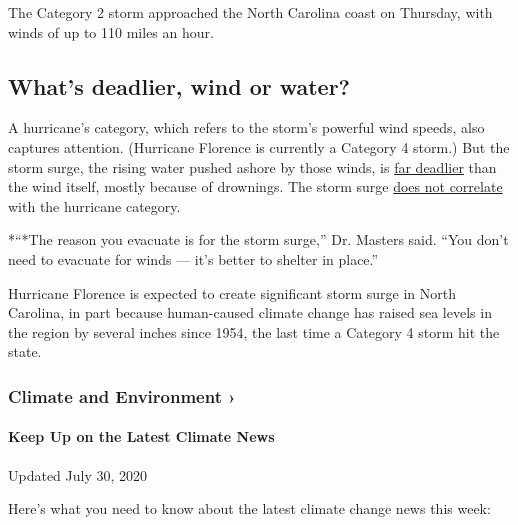 The Category 2 storm approached the North Carolina coast on Thursday,
with winds of up to 110 miles an hour.

\hypertarget{whats-deadlier-wind-or-water}{%
\subsection{What's deadlier, wind or
water?}\label{whats-deadlier-wind-or-water}}

A hurricane's category, which refers to the storm's powerful wind
speeds, also captures attention. (Hurricane Florence is currently a
Category 4 storm.) But the storm surge, the rising water pushed ashore
by those winds, is
\href{https://journals.ametsoc.org/doi/full/10.1175/BAMS-D-12-00074.1}{far
deadlier} than the wind itself, mostly because of drownings. The storm
surge
\href{https://www.nhc.noaa.gov/surge/StormSurgeCanBeDeadly10tips-single.pdf}{does
not correlate} with the hurricane category.

*``*The reason you evacuate is for the storm surge,'' Dr. Masters said.
``You don't need to evacuate for winds --- it's better to shelter in
place.''

Hurricane Florence is expected to create significant storm surge in
North Carolina, in part because human-caused climate change has raised
sea levels in the region by several inches since 1954, the last time a
Category 4 storm hit the state.

\href{https://www.nytimes.com/section/climate?action=click\&pgtype=Article\&state=default\&region=MAIN_CONTENT_1\&context=storylines_keepup}{}

\hypertarget{climate-and-environment-}{%
\subsubsection{Climate and Environment
›}\label{climate-and-environment-}}

\hypertarget{keep-up-on-the-latest-climate-news}{%
\paragraph{Keep Up on the Latest Climate
News}\label{keep-up-on-the-latest-climate-news}}

Updated July 30, 2020

Here's what you need to know about the latest climate change news this
week:

